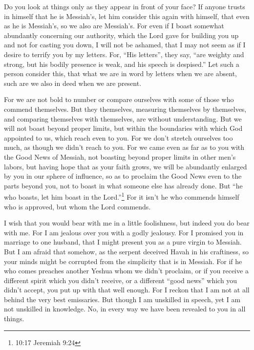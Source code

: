 \myverse{}Do you look at things only as they appear in front of your face?
If anyone trusts in himself that he is Messiah’s, let him consider this again with himself, that even
as he is Messiah’s, so we also are Messiah’s.
\myverse{}For even if I boast somewhat abundantly concerning our authority, which the
Lord gave for building you up and not for casting you down, I will not be ashamed,
\myverse{}that I may not seem as if I desire to terrify you by my letters.
\myverse{}For, “His letters”, they say, “are weighty and strong, but his bodily presence
is weak, and his speech is despised.”
\myverse{}Let such a person consider this, that what we are in word by letters when
we are absent, such are we also in deed when we are present.

\myverse{}For we are not bold to number or compare ourselves with some
of those who commend themselves. But they themselves, measuring themselves by themselves, and comparing
themselves with themselves, are without understanding.
\myverse{}But we will not boast beyond proper limits, but within the boundaries with
which God appointed to us, which reach even to you.
\myverse{}For we don’t stretch ourselves too much, as though we didn’t reach to you.
For we came even as far as to you with the Good News of Messiah,
\myverse{}not boasting beyond proper limits in other men’s labors, but having hope
that as your faith grows, we will be abundantly enlarged by you in our sphere of influence,
\myverse{}so as to proclaim the Good News even to the parts beyond you, not to boast
in what someone else has already done.
\myverse{}But “he who boasts, let him boast in the Lord.”\footnote{10:17 Jeremiah 9:24
}
\myverse{}For it isn’t he who commends himself who is approved, but whom the Lord commends.


\mychapter{} \myverse*{}I wish that you would bear with me in a little foolishness, but
indeed you do bear with me.
\myverse{}For I am jealous over you with a godly jealousy. For I promised you in marriage
to one husband, that I might present you as a pure virgin to Messiah.
\myverse{}But I am afraid that somehow, as the serpent deceived Havah in his craftiness,
so your minds might be corrupted from the simplicity that is in Messiah.
\myverse{}For if he who comes preaches another Yeshua whom we didn’t proclaim, or if
you receive a different spirit which you didn’t receive, or a different “good news” which you didn’t accept,
you put up with that well enough.
\myverse{}For I reckon that I am not at all behind the very best emissaries.
\myverse{}But though I am unskilled in speech, yet I am not unskilled in knowledge. No,
in every way we have been revealed to you in all things.

